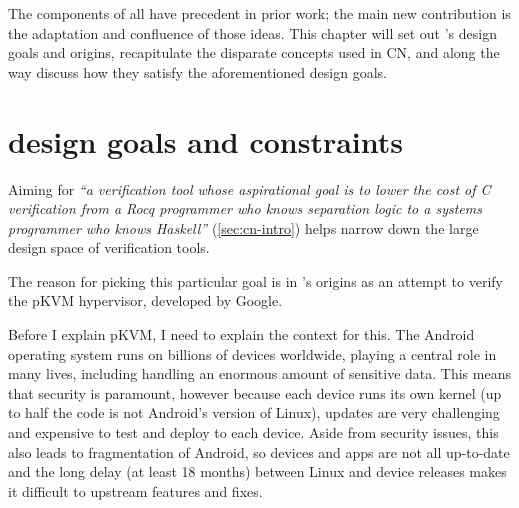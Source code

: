 \margintoc{}

The components of  all have precedent in prior work; the main
new contribution is the adaptation and confluence of those ideas. This chapter
will set out 's design goals and origins, recapitulate the disparate
concepts used in CN, and along the way discuss how they satisfy the
aforementioned design goals.

\section{ design goals and constraints}%
\label{sec:cn-goals}

Aiming for \emph{``a verification tool whose aspirational goal is to lower the
cost of C verification from a Rocq programmer who knows separation logic to a
systems programmer who knows Haskell''} (\cref{sec:cn-intro}) helps narrow
down the large design space of verification tools.

The reason for picking this particular goal is in 's origins as
an attempt to verify the pKVM hypervisor, developed by Google.

Before I explain pKVM, I need to explain the context for this. The Android
operating system runs on billions of devices worldwide, playing a central role
in many lives, including handling an enormous amount of sensitive data. This
means that security is paramount, however because each device runs its own
kernel (up to half the code is not Android's version of Linux), updates are
very challenging and expensive to test and deploy to each device. Aside from
security issues, this also leads to fragmentation of Android, so devices and
apps are not all up-to-date and the long delay (at least 18 months) between
Linux and device releases makes it difficult to upstream features and fixes.%

